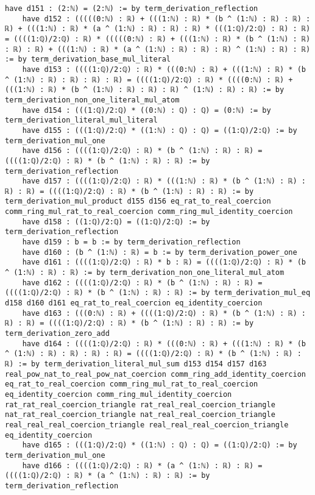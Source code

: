 \documentclass{article}
\begin{document}
\begin{tcolorbox}[colback=white!10, width=\linewidth]
\begin{lstlisting}[language=Lean4]
    have d151 : (2:ℕ) = (2:ℕ) := by term_derivation_reflection
    have d152 : (((((0:ℕ) : ℝ) + (((1:ℕ) : ℝ) * (b ^ (1:ℕ) : ℝ) : ℝ) : ℝ) + (((1:ℕ) : ℝ) * (a ^ (1:ℕ) : ℝ) : ℝ) : ℝ) * (((1:ℚ)/2:ℚ) : ℝ) : ℝ) = ((((1:ℚ)/2:ℚ) : ℝ) * (((((0:ℕ) : ℝ) + (((1:ℕ) : ℝ) * (b ^ (1:ℕ) : ℝ) : ℝ) : ℝ) + (((1:ℕ) : ℝ) * (a ^ (1:ℕ) : ℝ) : ℝ) : ℝ) ^ (1:ℕ) : ℝ) : ℝ) := by term_derivation_base_mul_literal
    have d153 : ((((1:ℚ)/2:ℚ) : ℝ) * (((0:ℕ) : ℝ) + (((1:ℕ) : ℝ) * (b ^ (1:ℕ) : ℝ) : ℝ) : ℝ) : ℝ) = ((((1:ℚ)/2:ℚ) : ℝ) * ((((0:ℕ) : ℝ) + (((1:ℕ) : ℝ) * (b ^ (1:ℕ) : ℝ) : ℝ) : ℝ) ^ (1:ℕ) : ℝ) : ℝ) := by term_derivation_non_one_literal_mul_atom
    have d154 : (((1:ℚ)/2:ℚ) * ((0:ℕ) : ℚ) : ℚ) = (0:ℕ) := by term_derivation_literal_mul_literal
    have d155 : (((1:ℚ)/2:ℚ) * ((1:ℕ) : ℚ) : ℚ) = ((1:ℚ)/2:ℚ) := by term_derivation_mul_one
    have d156 : ((((1:ℚ)/2:ℚ) : ℝ) * (b ^ (1:ℕ) : ℝ) : ℝ) = ((((1:ℚ)/2:ℚ) : ℝ) * (b ^ (1:ℕ) : ℝ) : ℝ) := by term_derivation_reflection
    have d157 : ((((1:ℚ)/2:ℚ) : ℝ) * (((1:ℕ) : ℝ) * (b ^ (1:ℕ) : ℝ) : ℝ) : ℝ) = ((((1:ℚ)/2:ℚ) : ℝ) * (b ^ (1:ℕ) : ℝ) : ℝ) := by term_derivation_mul_product d155 d156 eq_rat_to_real_coercion comm_ring_mul_rat_to_real_coercion comm_ring_mul_identity_coercion
    have d158 : ((1:ℚ)/2:ℚ) = ((1:ℚ)/2:ℚ) := by term_derivation_reflection
    have d159 : b = b := by term_derivation_reflection
    have d160 : (b ^ (1:ℕ) : ℝ) = b := by term_derivation_power_one
    have d161 : ((((1:ℚ)/2:ℚ) : ℝ) * b : ℝ) = ((((1:ℚ)/2:ℚ) : ℝ) * (b ^ (1:ℕ) : ℝ) : ℝ) := by term_derivation_non_one_literal_mul_atom
    have d162 : ((((1:ℚ)/2:ℚ) : ℝ) * (b ^ (1:ℕ) : ℝ) : ℝ) = ((((1:ℚ)/2:ℚ) : ℝ) * (b ^ (1:ℕ) : ℝ) : ℝ) := by term_derivation_mul_eq d158 d160 d161 eq_rat_to_real_coercion eq_identity_coercion
    have d163 : (((0:ℕ) : ℝ) + ((((1:ℚ)/2:ℚ) : ℝ) * (b ^ (1:ℕ) : ℝ) : ℝ) : ℝ) = ((((1:ℚ)/2:ℚ) : ℝ) * (b ^ (1:ℕ) : ℝ) : ℝ) := by term_derivation_zero_add
    have d164 : ((((1:ℚ)/2:ℚ) : ℝ) * (((0:ℕ) : ℝ) + (((1:ℕ) : ℝ) * (b ^ (1:ℕ) : ℝ) : ℝ) : ℝ) : ℝ) = ((((1:ℚ)/2:ℚ) : ℝ) * (b ^ (1:ℕ) : ℝ) : ℝ) := by term_derivation_literal_mul_sum d153 d154 d157 d163 real_pow_nat_to_real_pow_nat_coercion comm_ring_add_identity_coercion eq_rat_to_real_coercion comm_ring_mul_rat_to_real_coercion eq_identity_coercion comm_ring_mul_identity_coercion rat_rat_real_coercion_triangle rat_real_real_coercion_triangle nat_rat_real_coercion_triangle nat_real_real_coercion_triangle real_real_real_coercion_triangle real_real_real_coercion_triangle eq_identity_coercion
    have d165 : (((1:ℚ)/2:ℚ) * ((1:ℕ) : ℚ) : ℚ) = ((1:ℚ)/2:ℚ) := by term_derivation_mul_one
    have d166 : ((((1:ℚ)/2:ℚ) : ℝ) * (a ^ (1:ℕ) : ℝ) : ℝ) = ((((1:ℚ)/2:ℚ) : ℝ) * (a ^ (1:ℕ) : ℝ) : ℝ) := by term_derivation_reflection

\end{lstlisting}
\end{tcolorbox}
\end{document}
